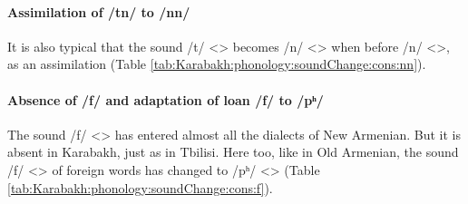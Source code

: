 \paragraph{Assimilation of /tn/ to /nn/} 

It is also typical that the sound /t/ <> becomes /n/ <> when before /n/ <>, as an assimilation (Table \ref{tab:Karabakh:phonology:soundChange:cons:nn}). 


\begin{table}[H]
	\centering
	\caption{Assimilation from Classical Armenian /tn/ <> to /nn/ <> in the Karabakh dialect}
	\label{tab:Karabakh:phonology:soundChange:cons:nn}
	\end{table}


\paragraph{Absence of /f/ and adaptation of loan /f/ to /pʰ/} 

The sound /f/ <> has entered almost all the dialects of New Armenian. But it is absent in Karabakh, just as in Tbilisi. Here too, like in Old Armenian, the sound /f/ <> of foreign words has changed to /pʰ/ <>
(Table \ref{tab:Karabakh:phonology:soundChange:cons:f}). 


